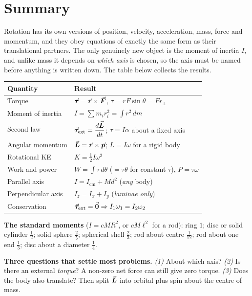 \section{Summary}\label{sec:summary14}
Rotation has its own versions of position, velocity, acceleration, mass, force and momentum, and they obey
equations of exactly the same form as their translational partners. The only genuinely new object is the
moment of inertia $I$, and unlike mass it depends on \emph{which axis} is chosen, so the axis must be named
before anything is written down. The table below collects the results.

\medskip
{\small\renewcommand{\arraystretch}{1.45}
\begin{center}
\begin{tabular}{@{}ll@{}}
\toprule
Quantity & Result\\
\midrule
Torque             & $\vec{\bm{\tau}}=\vec{\bm{r}}\times\vec{\bm{F}}$, \quad $\tau=rF\sin\theta=F r_\perp$\\[2pt]
Moment of inertia  & $I=\sum m_ir_i^{2}=\int r^{2}\,dm$\\[2pt]
Second law         & $\vec{\bm{\tau}}_{\text{ext}}=\dfrac{d\vec{\bm{L}}}{dt}$; \quad $\tau=I\alpha$ about a fixed axis\\[4pt]
Angular momentum   & $\vec{\bm{L}}=\vec{\bm{r}}\times\vec{\bm{p}}$; \quad $L=I\omega$ for a rigid body\\[2pt]
Rotational KE      & $K=\tfrac{1}{2}I\omega^{2}$\\[2pt]
Work and power     & $W=\int\tau\,d\theta$ ($=\tau\theta$ for constant $\tau$), \quad $P=\tau\omega$\\[2pt]
Parallel axis      & $I=I_{\text{cm}}+Md^{2}$ \quad (\emph{any} body)\\[2pt]
Perpendicular axis & $I_z=I_x+I_y$ \quad (\emph{laminae only})\\[2pt]
Conservation       & $\vec{\bm{\tau}}_{\text{ext}}=\vec{\bm{0}}\Rightarrow I_1\omega_1=I_2\omega_2$\\
\bottomrule
\end{tabular}
\end{center}
}

\medskip
\textbf{The standard moments} ($I=cMR^{2}$, or $cM\ell^{2}$ for a rod): ring $1$; disc or solid
cylinder $\tfrac{1}{2}$; solid sphere $\tfrac{2}{5}$; spherical shell $\tfrac{2}{3}$; rod about centre
$\tfrac{1}{12}$; rod about one end $\tfrac{1}{3}$; disc about a diameter $\tfrac{1}{4}$.

\medskip
\textbf{Three questions that settle most problems.} \emph{(1)} About which axis?
\emph{(2)} Is there an external \emph{torque}? A non-zero net force can still give zero torque.
\emph{(3)} Does the body also translate? Then split $\vec{\bm{L}}$ into orbital plus spin about the centre of
mass.

